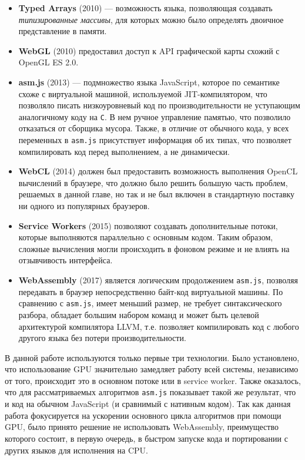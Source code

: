 \begin{itemize}
\item {\bfseries Typed Arrays} (2010) --- возможность языка, позволяющая создавать {\itshape типизированные массивы}, для которых можно было определять двоичное представление в памяти.
\item {\bfseries WebGL} (2010) предоставил доступ к API графической карты схожий с OpenGL ES 2.0.
\item {\bfseries asm.js} (2013) --- подмножество языка JavaScript, которое по семантике схоже с виртуальной машиной, используемой JIT-компилятором, что позволяло писать низкоуровневый код по производительности не уступающим аналогичному коду на \texttt{C}. В нем ручное управление памятью, что позволило отказаться от сборщика мусора. Также, в отличие от обычного кода, у всех переменных в \texttt{asm.js} присутствует информация об их типах, что позволяет компилировать код перед выполнением, а не динамически.
\item {\bfseries WebCL} (2014) должен был предоставить возможность выполнения OpenCL вычислений в браузере, что должно было решить большую часть проблем, решаемых в данной главе, но так и не был включен в стандартную поставку ни одного из популярных браузеров.
\item {\bfseries Service Workers} (2015) позволяют создавать дополнительные потоки, которые выполняются параллельно с основным кодом. Таким образом, сложные вычисления могли происходить в фоновом режиме и не влиять на отзывчивость интерфейса.
\item {\bfseries WebAssembly} (2017) является логическим продолжением \texttt{asm.js}, позволяя передавать в браузер непосредственно байт-код виртуальной машины. По сравнению с \texttt{asm.js}, имеет меньший размер, не требует синтаксического разбора, обладает большим набором команд и может быть целевой архитектурой компилятора LLVM, т.е. позволяет компилировать код с любого другого языка без потери производительности.
\end{itemize}

В данной работе используются только первые три технологии. Было установлено, что использование GPU значительно замедляет работу всей системы, независимо от того, происходит это в основном потоке или в service worker. Также оказалось, что для рассматриваемых алгоритмов \texttt{asm.js} показывает такой же результат, что и код на обычном JavaScript (и сравнимый с нативным кодом). Так как данная работа фокусируется на ускорении основного цикла алгоритмов при помощи GPU, было принято решение не использовать WebAssembly, преимущество которого состоит, в первую очередь, в быстром запуске кода и портировании с других языков для исполнения на CPU.

